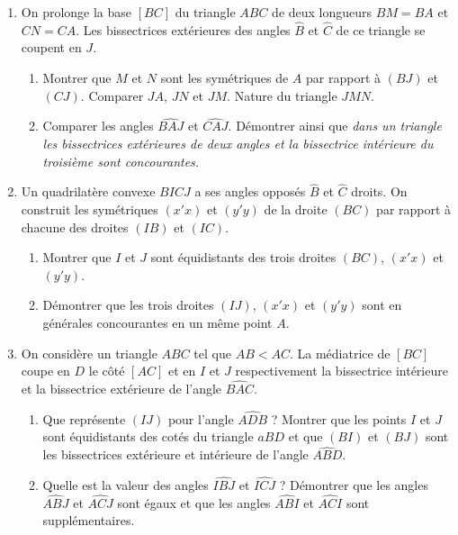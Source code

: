 \documentclass[12 pt]{report}
\theoremstyle{plain}
\newcounter{n}
\begin{document}
\begin{enumerate}
\item On prolonge la base $[BC]$ du triangle $ABC$ de deux longueurs $BM=BA$ et $CN=CA$. Les bissectrices extérieures des angles $\widehat{B}$ et $\widehat{C}$ de ce triangle se coupent en $J$. \begin{enumerate}
\item Montrer que $M$ et $N$ sont les symétriques de $A$ par rapport à $(BJ)$ et $(CJ)$. Comparer $JA$, $JN$ et $JM$. Nature du triangle $JMN$. 
\item Comparer les angles $\widehat{BAJ}$ et $\widehat{CAJ}$. Démontrer ainsi que
\emph{dans un triangle les bissectrices extérieures de deux angles et la bissectrice
intérieure du troisième sont concourantes.}
\end{enumerate}
\item Un quadrilatère convexe $BICJ$ a ses angles opposés $\widehat{B}$ et $\widehat{C}$ droits. On construit les symétriques $(x'x)$ et $(y'y)$ de la droite 
$(BC)$ par rapport à chacune des droites $(IB)$ et $(IC)$. 
\begin{enumerate}
\item Montrer que $I$ et $J$ sont équidistants des trois droites $(BC)$, $(x'x)$ et 
$(y'y)$.
\item Démontrer que les trois droites $(IJ)$, $(x'x)$ et $(y'y)$ sont en générales 
concourantes en un même point $A$.
\end{enumerate}
\item On considère un triangle $ABC$ tel que $AB<AC$. La médiatrice de $[BC]$ coupe en $D$ le côté $[AC]$ et en $I$ et $J$ respectivement la bissectrice intérieure et la
bissectrice extérieure de l'angle $\widehat{BAC}$. \begin{enumerate}
\item Que représente $(IJ)$ pour l'angle $\widehat{ADB}$ ? Montrer que les points $I$ et $J$ sont équidistants des cotés du triangle $aBD$ et que $(BI)$ et $(BJ)$ sont 
les bissectrices extérieure et intérieure de l'angle $\widehat{ABD}$. 
\item Quelle est la valeur des angles $\widehat{IBJ}$ et $\widehat{ICJ}$ ? Démontrer que les angles $\widehat{ABJ}$ et $\widehat{ACJ}$ sont égaux et que les angles $\widehat{ABI}$ et $\widehat{ACI}$ sont supplémentaires.
\end{enumerate}
\end{enumerate}
\end{document}
